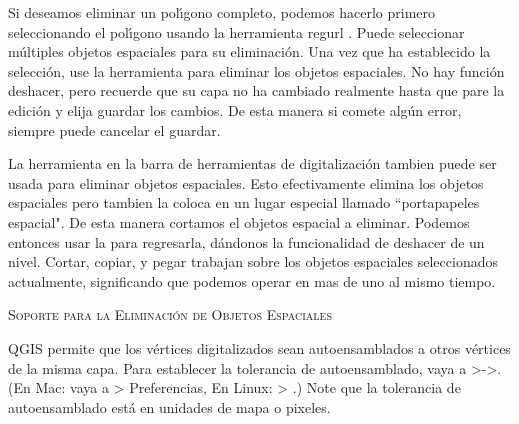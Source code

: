 
Si deseamos eliminar un pol\'{\i}gono completo, podemos hacerlo primero seleccionando 
el pol\'{\i}gono usando la herramienta regurl . Puede seleccionar 
m\'ultiples objetos espaciales para su eliminaci\'on. Una vez que ha establecido la selecci\'on, use la 
herramienta  para eliminar los objetos espaciales. No hay funci\'on deshacer, 
pero recuerde que su capa no ha cambiado realmente hasta que pare la edici\'on y elija 
guardar los cambios. De esta manera si comete alg\'un error, siempre puede cancelar el guardar.

La herramienta  en la barra de herramientas de digitalizaci\'on tambien puede
ser usada para eliminar objetos espaciales. Esto efectivamente elimina los objetos espaciales pero
tambien la coloca en un lugar especial llamado ``portapapeles espacial". De esta manera cortamos el objetos espacial a eliminar. 
Podemos entonces usar la  para regresarla, d\'andonos la funcionalidad de deshacer de un nivel. 
Cortar, copiar, y pegar trabajan sobre los objetos espaciales seleccionados actualmente, 
significando que podemos operar en mas de uno al mismo tiempo.

\begin{Tip}[ht]\caption{\textsc{Soporte para la Eliminaci\'on de Objetos Espaciales}}
\end{Tip}

QGIS permite que los v\'ertices digitalizados sean autoensamblados a otros v\'ertices de la misma capa. Para 
establecer la tolerancia de autoensamblado, vaya a
>->.
(En Mac: vaya a   > Preferencias, En Linux:  > .)
Note que la tolerancia de autoensamblado est\'a en unidades de mapa o pixeles.


